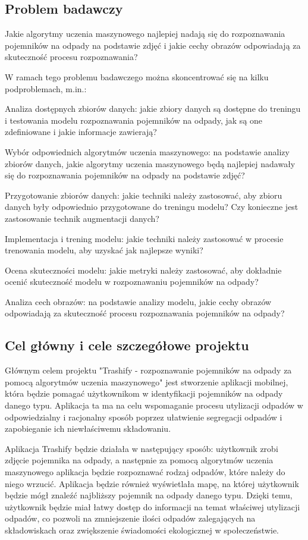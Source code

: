 \documentclass[12pt,oneside]{book}
\begin{document}
\subsection{Problem badawczy}
Jakie algorytmy uczenia maszynowego najlepiej nadają się do rozpoznawania pojemników na odpady na podstawie zdjęć i jakie cechy obrazów odpowiadają za skuteczność procesu rozpoznawania?

W ramach tego problemu badawczego można skoncentrować się na kilku podproblemach, m.in.:

    Analiza dostępnych zbiorów danych: jakie zbiory danych są dostępne do treningu i testowania modelu rozpoznawania pojemników na odpady, jak są one zdefiniowane i jakie informacje zawierają?

    Wybór odpowiednich algorytmów uczenia maszynowego: na podstawie analizy zbiorów danych, jakie algorytmy uczenia maszynowego będą najlepiej nadawały się do rozpoznawania pojemników na odpady na podstawie zdjęć?

    Przygotowanie zbiorów danych: jakie techniki należy zastosować, aby zbioru danych były odpowiednio przygotowane do treningu modelu? Czy konieczne jest zastosowanie technik augmentacji danych?

    Implementacja i trening modelu: jakie techniki należy zastosować w procesie trenowania modelu, aby uzyskać jak najlepsze wyniki?

    Ocena skuteczności modelu: jakie metryki należy zastosować, aby dokładnie ocenić skuteczność modelu w rozpoznawaniu pojemników na odpady?

    Analiza cech obrazów: na podstawie analizy modelu, jakie cechy obrazów odpowiadają za skuteczność procesu rozpoznawania pojemników na odpady?

\subsection{Cel główny i cele szczegółowe projektu}

Głównym celem projektu "Trashify - rozpoznawanie pojemników na odpady za pomocą algorytmów uczenia maszynowego" jest stworzenie aplikacji mobilnej, która będzie pomagać użytkownikom w identyfikacji pojemników na odpady danego typu. Aplikacja ta ma na celu wspomaganie procesu utylizacji odpadów w odpowiedzialny i racjonalny sposób poprzez ułatwienie segregacji odpadów i zapobieganie ich niewłaściwemu składowaniu.

Aplikacja Trashify będzie działała w następujący sposób: użytkownik zrobi zdjęcie pojemnika na odpady, a następnie za pomocą algorytmów uczenia maszynowego aplikacja będzie rozpoznawać rodzaj odpadów, które należy do niego wrzucić. Aplikacja będzie również wyświetlała mapę, na której użytkownik będzie mógł znaleźć najbliższy pojemnik na odpady danego typu. Dzięki temu, użytkownik będzie miał łatwy dostęp do informacji na temat właściwej utylizacji odpadów, co pozwoli na zmniejszenie ilości odpadów zalegających na składowiskach oraz zwiększenie świadomości ekologicznej w społeczeństwie.
\end{document}
